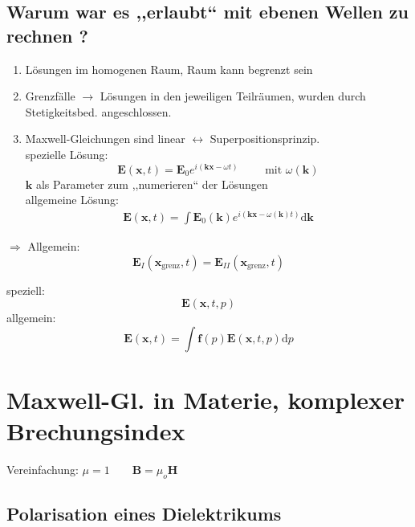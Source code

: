 \documentclass[titlepage,11pt,a4paper,ngerman]{report}
\newcommand{\tx}[1]{\textrm{#1}}
\newcommand{\dd}{\tx{d}}
\renewcommand{\vec}[1]{\boldsymbol{#1}}
\begin{document}
\subsection{Warum war es ,,erlaubt`` mit ebenen Wellen zu rechnen ?} %

\begin{enumerate}[(1)]
	\item Lösungen im homogenen Raum, Raum kann begrenzt sein
	\item Grenzfälle $ \rightarrow $ Lösungen in den jeweiligen Teilräumen, wurden durch Stetigkeitsbed. angeschlossen.
	\item Maxwell-Gleichungen sind linear $ \leftrightarrow $ Superpositionsprinzip.\\[5pt]
	spezielle Lösung:
	\begin{equation*}
	\vec{E}(\vec{x},t) = \vec{E}_0 e^{i(\vec{k} \vec{x} - \omega t)} \qquad \tx{ mit } \omega(\vec{k})
	\end{equation*}
	$ \vec{k} $ als Parameter zum ,,numerieren`` der Lösungen\\[5pt]
	allgemeine Lösung:
	\begin{eqnarray}
	\vec{E}(\vec{x},t) = \int \vec{E}_0(\vec{k}) e^{i(\vec{k} \vec{x} - \omega(\vec{k}) t)} \dd \vec{k}
	\end{eqnarray}
\end{enumerate}
$ \Rightarrow $ Allgemein:
\begin{equation*}
\vec{E}_I(\vec{x}_{\tx{grenz}},t) = \vec{E}_{II} (\vec{x}_{\tx{grenz}},t)
\end{equation*}


\noindent
speziell:
\begin{equation*}
\vec{E}(\vec{x},t,p)
\end{equation*}
allgemein:
\begin{equation*}
\vec{E}(\vec{x},t) = \int \vec{f}(p) \vec{E}(\vec{x},t,p) \dd p
\end{equation*}

\section{Maxwell-Gl. in Materie, komplexer Brechungsindex}

Vereinfachung: $ \mu = 1 \qquad \vec{B} = \mu_o \vec{H} $

\subsection{Polarisation eines Dielektrikums}
\end{document}
